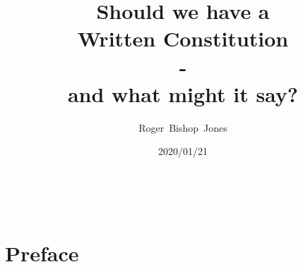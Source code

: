 \documentclass[14pt,titlepage]{extarticle}
\title{\LARGE \bf Should we have a \\Written Constitution \\- \\and what might it say?}
\author{Roger~Bishop~Jones}
\date{\small 2020/01/21}
\newcommand{\ignore}[1]{}
\begin{document}

                               
\begin{titlepage}
  \maketitle
  
 



 

\end{titlepage}

\ \

\ignore{
\begin{centering}
{\LARGE \bf Should we have a \\Written Constitution?\\ - \\and what might it say?\\}
\end{centering}
}%

\setcounter{tocdepth}{2}
{\parskip-0pt\tableofcontents}




\section*{Preface}
\end{document}
